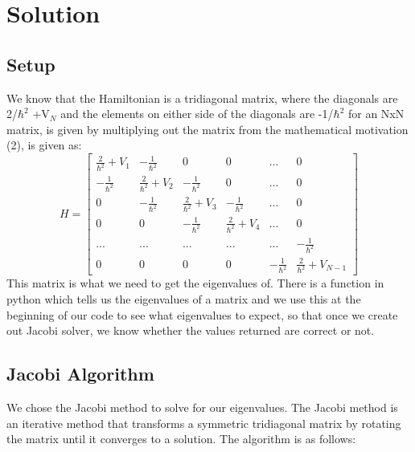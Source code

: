 \documentclass{article}
\begin{document}
\section{Solution}
\subsection{Setup}
We know that the Hamiltonian is a tridiagonal matrix, where the diagonals are 2/$\hbar^2$ +V$_N$ and the elements on either side of the diagonals are -1/$\hbar^2$ for an NxN matrix, is given by multiplying out the matrix from the mathematical motivation (2), is given as:
\[
H=\begin{bmatrix}
\frac{2}{\hbar^2}+V_1 & -\frac{1}{\hbar^2}&0&0&...&0\\
 -\frac{1}{\hbar^2}&\frac{2}{\hbar^2}+V_2& -\frac{1}{\hbar^2}&0&...&0\\
0& -\frac{1}{\hbar^2}&\frac{2}{\hbar^2}+V_3& -\frac{1}{\hbar^2}&...&0\\
0&0&-\frac{1}{\hbar^2}&\frac{2}{\hbar^2}+V_4&...&0\\
...&...&...&...&...&-\frac{1}{\hbar^2}\\
0&0&0&0& -\frac{1}{\hbar^2}&\frac{2}{\hbar^2}+V_{N-1}
\end{bmatrix}
\]
This matrix is what we need to get the eigenvalues of. There is a function in python which tells us the eigenvalues of a matrix and we use this at the beginning of our code to see what eigenvalues to expect, so that once we create out Jacobi solver, we know whether the values returned are correct or not.

\subsection{Jacobi Algorithm}
We chose the Jacobi method to solve for our eigenvalues. The Jacobi method is an iterative method that transforms a symmetric tridiagonal matrix by rotating the matrix until it converges to a solution. The algorithm is as follows:
\end{document}
